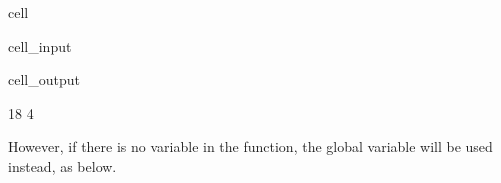 \documentclass[letterpaper,10pt,english]{jupyterBook}
\begin{document}
\begin{sphinxuseclass}{cell}\begin{sphinxVerbatimInput}

\begin{sphinxuseclass}{cell_input}
\begin{sphinxVerbatim}[commandchars=\\\{\}]
  

 
      
       
    
\end{sphinxVerbatim}

\end{sphinxuseclass}\end{sphinxVerbatimInput}
\begin{sphinxVerbatimOutput}

\begin{sphinxuseclass}{cell_output}
\begin{sphinxVerbatim}[commandchars=\\\{\}]
18
4
\end{sphinxVerbatim}

\end{sphinxuseclass}\end{sphinxVerbatimOutput}

\end{sphinxuseclass}
\sphinxAtStartPar
However, if there is no  variable  in the function, the global variable  will be used instead, as below.
\end{document}
